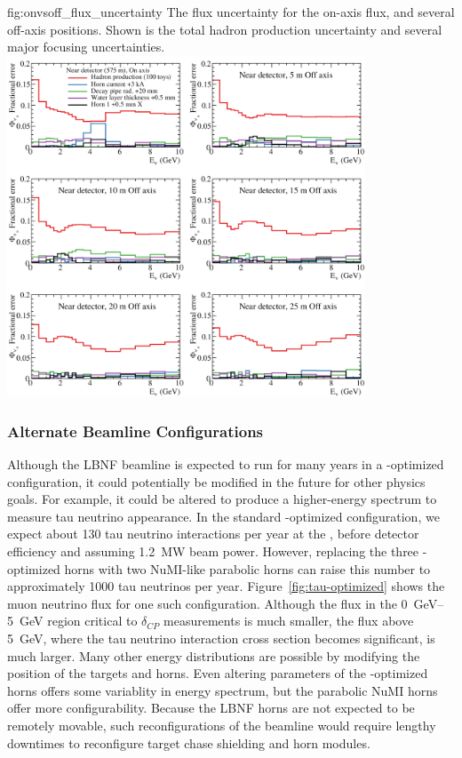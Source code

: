 
\begin{dunefigure}{fig:onvsoff_flux_uncertainty}
{The flux uncertainty for the on-axis flux, and several off-axis positions. Shown is the total hadron production uncertainty and several major focusing uncertainties.}
    \includegraphics[width=0.8\textwidth]{graphics/onaxis_vs_offaxis_uncertainties.png}
\end{dunefigure}

\subsubsection{Alternate Beamline Configurations}

Although the LBNF beamline is expected to run for many years in a -optimized configuration, it could potentially be modified in the future for other physics goals.  For example, it could be altered to produce a higher-energy spectrum %
to measure tau neutrino appearance.  In the standard -optimized configuration, we expect about 130 tau neutrino  interactions per year %
at the , before detector efficiency and assuming \SI{1.2}{MW} beam power.  However, replacing the three -optimized horns with two NuMI-like parabolic horns can raise this number to approximately \num{1000} tau neutrinos per year.  Figure~\ref{fig:tau-optimized} shows the muon neutrino flux for one such configuration.  Although the flux in the \SIrange{0}{5}{\GeV} region critical to $\delta_{CP}$ measurements is much smaller, the flux above \SI{5}{\GeV}, where the tau neutrino interaction cross section becomes significant, is much larger.  Many other energy distributions are possible by modifying the position of the targets and horns.  Even altering parameters of the -optimized horns offers some variablity in energy spectrum, but the parabolic NuMI horns offer more configurability.  Because the LBNF horns are not expected to be remotely movable, such reconfigurations of the beamline would require lengthy downtimes to reconfigure target chase shielding and horn modules.   

